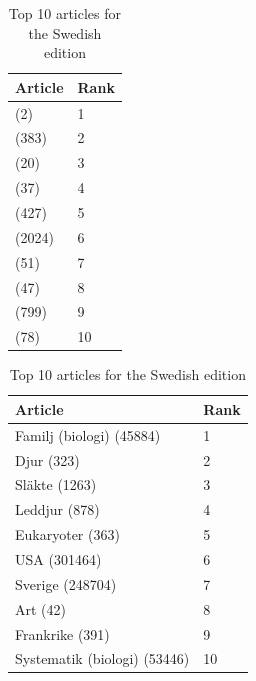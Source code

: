 \begin{table}[htbp]
    \begin{minipage}{.45\linewidth}
        \centering
        \begin{tabular}{ll}
            \toprule
            Article & Rank\\
            \midrule
            (2) & 1\\
            (383) & 2\\
            (20) & 3\\
            (37) & 4\\
            (427) & 5\\
            (2024) & 6\\
            (51) & 7\\
            (47) & 8\\
            (799) & 9\\
            (78) & 10\\
            \bottomrule
        \end{tabular}
        \caption{Top 10 articles for the Russian edition}
    \end{minipage}
    \hfill
    \begin{minipage}{.45\linewidth}
        \centering
        \begin{tabular}{ll}
            \toprule
            Article & Rank\\
            \midrule
            Familj (biologi) (45884) & 1\\
            Djur (323) & 2\\
            Släkte (1263) & 3\\
            Leddjur (878) & 4\\
            Eukaryoter (363) & 5\\
            USA (301464) & 6\\
            Sverige (248704) & 7\\
            Art (42) & 8\\
            Frankrike (391) & 9\\
            Systematik (biologi) (53446) & 10\\
            \bottomrule
        \end{tabular}
        \caption{Top 10 articles for the Swedish edition}
    \end{minipage}
\end{table}
